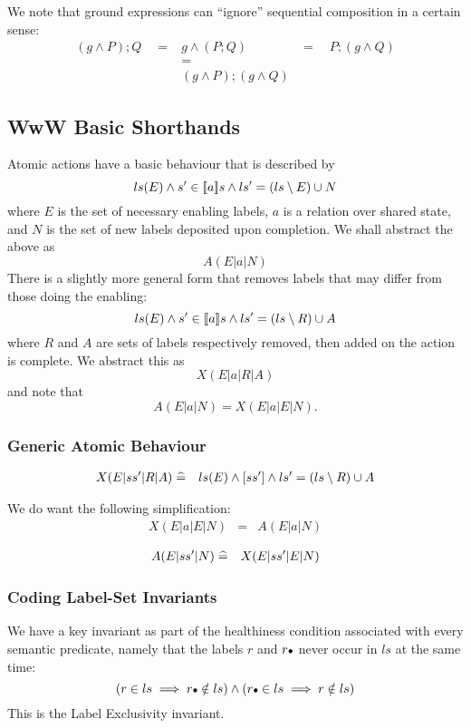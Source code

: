 We note that ground expressions can ``ignore'' sequential composition
in a certain sense:
\begin{eqnarray*}
   (g \land P) ; Q \quad = &     g \land ( P ; Q)      & = \quad P ; (g \land Q)
\\                         &           =
\\                         & (g \land P) ; (g \land Q)
\end{eqnarray*}

\subsection{WwW Basic Shorthands}

Atomic actions have a basic behaviour that is described by
\[
ls(E) \land s' \in [\![{a}]\!] s \land ls' = (ls\setminus E) \cup N
\]
where $E$ is the set of necessary enabling labels,
$a$ is a relation over shared state,
and $N$ is the set of new labels deposited upon completion.
We shall abstract the above as
\[
A(E|a|N)
\]
There is a slightly more general form that removes labels
that may differ from those doing the enabling:
\[
ls(E) \land s' \in [\![{a}]\!] s \land ls' = (ls\setminus R) \cup A
\]
where $R$ and $A$ are sets of labels respectively removed, then added
on the action is complete.
We abstract this as
\[
  X(E|a|R|A)
\]
and note that
\[
  A(E|a|N) = X(E|a|E|N).
\]


\subsubsection{Generic Atomic Behaviour}

\begin{eqnarray*}
   X(E|ss'|R|A)
   &\mathrel{\widehat=}&
   ls(E) \land [ss'] \land ls'=(ls\setminus R)\cup A
\end{eqnarray*}

We do want the following simplification:
\begin{eqnarray*}
  X(E|a|E|N) &=& A(E|a|N)
\end{eqnarray*}

\begin{eqnarray*}
   A(E|ss'|N)
   &\mathrel{\widehat=}&
   X(E|ss'|E|N)
\end{eqnarray*}


\subsubsection{Coding Label-Set Invariants}

We have a key invariant as part of the healthiness
condition associated with every semantic predicate,
namely that the labels $r$ and $r{\scriptstyle{\bullet}}$ never occur in  $ls$ at
the same time:
\[
 ( r \in ls \implies r{\scriptstyle{\bullet}} \notin ls )
 \land
 ( r{\scriptstyle{\bullet}} \in ls \implies r \notin ls )
\]
This is the Label Exclusivity invariant.

